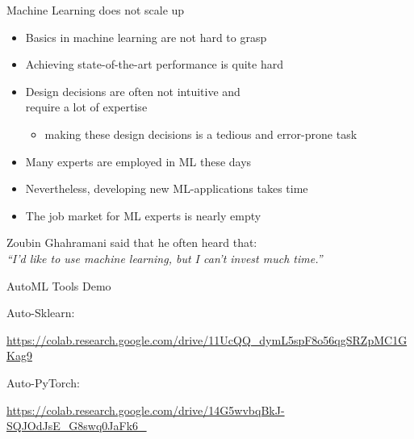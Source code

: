 \begin{frame}[c]{Machine Learning does not scale up}

\begin{itemize}
  \item Basics in machine learning are not hard to grasp
  \smallskip
  \pause
  \item Achieving state-of-the-art performance is quite hard
  \smallskip
  \pause
  \item Design decisions are often not intuitive and\\ require a lot of expertise
  \begin{itemize}
    \item making these design decisions is a tedious and error-prone task
  \end{itemize}
  \pause
  \smallskip
  \item Many experts are employed in ML these days
  \smallskip
  \pause
  \item Nevertheless, developing new ML-applications takes time
  \smallskip
  \item The job market for ML experts is nearly empty
\end{itemize}

\pause
\bigskip

Zoubin Ghahramani said that he often heard that:\\
\hfill \textit{``I'd like to use machine learning, but I can't invest much time.''}



\end{frame}
\begin{frame}[c]{AutoML Tools Demo}

Auto-Sklearn:

\url{https://colab.research.google.com/drive/11UcQQ_dymL5spF8o56qgSRZpMC1GKag9}

\bigskip
Auto-PyTorch:

\url{https://colab.research.google.com/drive/14G5wvbqBkJ-SQJOdJsE_G8swq0JaFk6_}


\end{frame}
